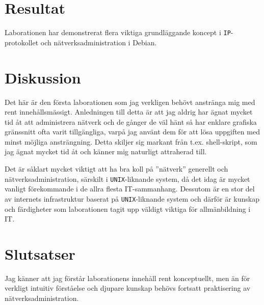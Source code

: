 %
%
%


\section{Resultat}
Laborationen har demonstrerat flera viktiga grundläggande koncept i
\texttt{IP}-protokollet och nätverksadministration i Debian.

\section{Diskussion}
Det här är den första laborationen som jag verkligen behövt anstränga mig med
rent innehållsmässigt. Anledningen till detta är att jag aldrig har ägnat mycket
tid åt att administrera nätverk och de gånger de väl hänt så har enklare grafiska
gränssnitt ofta varit tillgängliga, varpå jag använt dem för att lösa uppgiften
med minst möjliga ansträngning. Detta skiljer sig markant från t.ex. shell-skript, 
som jag ägnat mycket tid åt och känner mig naturligt attraherad till.

Det är såklart mycket viktigt att ha bra koll på ''nätverk'' generellt och
nätverksadministration, särskilt i \texttt{UNIX}-liknande system, då det idag
är mycket vanligt förekommande i de allra flesta IT-sammanhang. Dessutom är en
stor del av internets infrastruktur baserat på \texttt{UNIX}-liknande system
och därför är kunskap och färdigheter som laborationen tagit upp väldigt
viktiga för allmänbildning i IT.


\section{Slutsatser}
Jag känner att jag förstår laborationens innehåll rent konceptuellt, men än för
verkligt intuitiv förståelse och djupare kunskap behövs fortsatt praktisering
av nätverksadministration.
